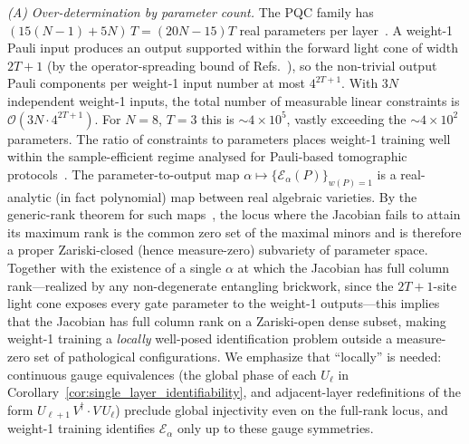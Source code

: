 \documentclass[%
 reprint,
superscriptaddress,
 amsmath,amssymb,
 aps,
]{revtex4-2}
\newcommand{\E}{\mathcal{E}}
\begin{document}
\emph{(A) Over-determination by parameter count.}
The PQC family has $(15(N-1)+5N)\,T = (20N-15)T$ real parameters per layer~\cite{khatri2019qaqc,benedetti2019pqc}. A weight-1 Pauli input produces an output supported within the forward light cone of width $2T+1$ (by the operator-spreading bound of Refs.~\cite{nahum2018operator,vonKeyserlingk2018operatorhydrodynamics,chen2018operator}), so the non-trivial output Pauli components per weight-1 input number at most $4^{2T+1}$. With $3N$ independent weight-1 inputs, the total number of measurable linear constraints is $\mathcal{O}(3N\cdot 4^{2T+1})$. For $N=8$, $T=3$ this is $\sim 4\times 10^5$, vastly exceeding the $\sim 4\times 10^2$ parameters. The ratio of constraints to parameters places weight-1 training well within the sample-efficient regime analysed for Pauli-based tomographic protocols~\cite{flammia2011direct,huang2020predicting,mohseni2008tomography}. The parameter-to-output map $\alpha\mapsto\{\E_\alpha(P)\}_{w(P)=1}$ is a real-analytic (in fact polynomial) map between real algebraic varieties. By the generic-rank theorem for such maps~\cite{Sontag1998,bochnak1998realalgebraic}, the locus where the Jacobian fails to attain its maximum rank is the common zero set of the maximal minors and is therefore a proper Zariski-closed (hence measure-zero) subvariety of parameter space. Together with the existence of a single $\alpha$ at which the Jacobian has full column rank---realized by any non-degenerate entangling brickwork, since the $2T+1$-site light cone exposes every gate parameter to the weight-1 outputs---this implies that the Jacobian has full column rank on a Zariski-open dense subset, making weight-1 training a \emph{locally} well-posed identification problem outside a measure-zero set of pathological configurations. We emphasize that ``locally'' is needed: continuous gauge equivalences (the global phase of each $U_\ell$ in Corollary~\ref{cor:single_layer_identifiability}, and adjacent-layer redefinitions of the form $U_{\ell+1}\,V^{\dagger}\cdot V\,U_\ell$) preclude global injectivity even on the full-rank locus, and weight-1 training identifies $\E_\alpha$ only up to these gauge symmetries.
\end{document}
